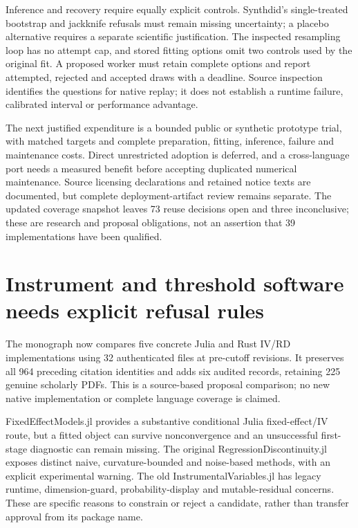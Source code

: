Inference and recovery require equally explicit controls. Synthdid's
single-treated bootstrap and jackknife refusals must remain missing
uncertainty; a placebo alternative requires a separate scientific
justification. The inspected resampling loop has no attempt cap, and
stored fitting options omit two controls used by the original fit. A
proposed worker must retain complete options and report attempted,
rejected and accepted draws with a deadline. Source inspection
identifies the questions for native replay; it does not establish a
runtime failure, calibrated interval or performance advantage.
\citep{exec23_synthdid_reuse_source}

The next justified expenditure is a bounded public or synthetic
prototype trial, with matched targets and complete preparation, fitting,
inference, failure and maintenance costs. Direct unrestricted adoption
is deferred, and a cross-language port needs a measured benefit before
accepting duplicated numerical maintenance. Source licensing
declarations and retained notice texts are documented, but complete
deployment-artifact review remains separate. The updated coverage
snapshot leaves 73 reuse decisions open and three inconclusive; these
are research and proposal obligations, not an assertion that 39
implementations have been qualified. \citep{sp23panel_progress}

\hypertarget{instrument-and-threshold-software-needs-explicit-refusal-rules}{%
\section{Instrument and threshold software needs explicit refusal
rules}\label{instrument-and-threshold-software-needs-explicit-refusal-rules}}

The monograph now compares five concrete Julia and Rust IV/RD
implementations using 32 authenticated files at pre-cutoff revisions. It
preserves all 964 preceding citation identities and adds six audited
records, retaining 225 genuine scholarly PDFs. This is a source-based
proposal comparison; no new native implementation or complete language
coverage is claimed.
\citep{sp23otheriv_reader,exec23_otheriv_source_0,exec23_otheriv_source_1,exec23_otheriv_source_2,exec23_otheriv_source_3,exec23_otheriv_source_4}

FixedEffectModels.jl provides a substantive conditional Julia
fixed-effect/IV route, but a fitted object can survive nonconvergence
and an unsuccessful first-stage diagnostic can remain missing. The
original RegressionDiscontinuity.jl exposes distinct naive,
curvature-bounded and noise-based methods, with an explicit experimental
warning. The old InstrumentalVariables.jl has legacy runtime,
dimension-guard, probability-display and mutable-residual concerns.
These are specific reasons to constrain or reject a candidate, rather
than transfer approval from its package name.
\citep{exec23_otheriv_source_0,exec23_otheriv_source_1,exec23_otheriv_source_2}

